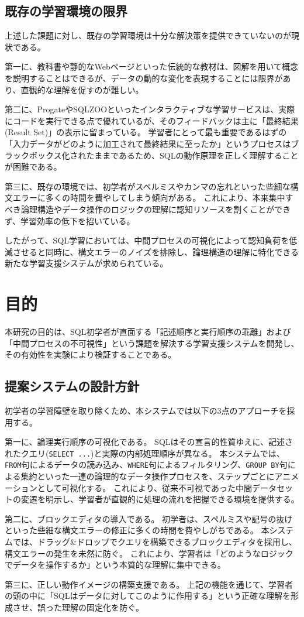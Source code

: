 \documentclass[uplatex,a4paper,12pt]{ujreport}
\begin{document}
\subsection{既存の学習環境の限界}
上述した課題に対し、既存の学習環境は十分な解決策を提供できていないのが現状である。
\par
第一に、教科書や静的なWebページといった伝統的な教材は、図解を用いて概念を説明することはできるが、データの動的な変化を表現することには限界があり、直観的な理解を促すのが難しい。
\par
第二に、ProgateやSQLZOOといったインタラクティブな学習サービスは、実際にコードを実行できる点で優れているが、そのフィードバックは主に「最終結果(Result Set)」の表示に留まっている。
学習者にとって最も重要であるはずの「入力データがどのように加工されて最終結果に至ったか」というプロセスはブラックボックス化されたままであるため、SQLの動作原理を正しく理解することが困難である。
\par
第三に、既存の環境では、初学者がスペルミスやカンマの忘れといった些細な構文エラーに多くの時間を費やしてしまう傾向がある。
これにより、本来集中すべき論理構造やデータ操作のロジックの理解に認知リソースを割くことができず、学習効率の低下を招いている。
\par
したがって、SQL学習においては、中間プロセスの可視化によって認知負荷を低減させると同時に、構文エラーのノイズを排除し、論理構造の理解に特化できる新たな学習支援システムが求められている。

\section{目的}
本研究の目的は、SQL初学者が直面する「記述順序と実行順序の乖離」および「中間プロセスの不可視性」という課題を解決する学習支援システムを開発し、その有効性を実験により検証することである。
\subsection{提案システムの設計方針}
初学者の学習障壁を取り除くため、本システムでは以下の3点のアプローチを採用する。
\par
第一に、論理実行順序の可視化である。
SQLはその宣言的性質ゆえに、記述されたクエリ(\texttt{SELECT ...})と実際の内部処理順序が異なる。
本システムでは、\texttt{FROM}句によるデータの読み込み、\texttt{WHERE}句によるフィルタリング、\texttt{GROUP BY}句による集約といった一連の論理的なデータ操作プロセスを、ステップごとにアニメーションとして可視化する。
これにより、従来不可視であった中間データセットの変遷を明示し、学習者が直観的に処理の流れを把握できる環境を提供する。
\par
第二に、ブロックエディタの導入である。
初学者は、スペルミスや記号の抜けといった些細な構文エラーの修正に多くの時間を費やしがちである。
本システムでは、ドラッグ\&ドロップでクエリを構築できるブロックエディタを採用し、構文エラーの発生を未然に防ぐ。
これにより、学習者は「どのようなロジックでデータを操作するか」という本質的な理解に集中できる。
\par
第三に、正しい動作イメージの構築支援である。
上記の機能を通じて、学習者の頭の中に「SQLはデータに対してこのように作用する」という正確な理解を形成させ、誤った理解の固定化を防ぐ。
\end{document}

